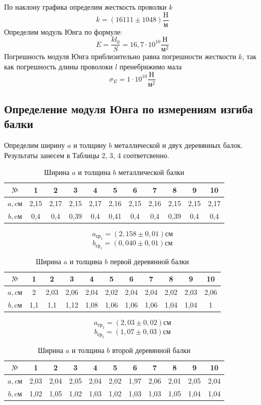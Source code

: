\documentclass[a4paper,12pt]{article} %
\begin{document}
По наклону графика определим жесткость проволки $k$
\[k = (16111\pm1048)\frac{\text{H}}{\text{м}}\]
Определим модуль Юнга по формуле:
\[E = \frac{kl_0}{S} = 16,7\cdot 10^{10}\frac{\text{Н}}{\text{м}^2}\]
Погрешность модуля Юнга приблизительно равна погрешности жесткости $k$, так как погрешность длины проволоки $l$ пренебрижимо мала
\[\sigma_E = 1\cdot 10^{10} \frac{\text{Н}}{\text{м}^2}\]
\subsection{Определение модуля Юнга по измерениям изгиба балки}
Определим ширину $a$ и толщину $b$ металлической и двух деревянных балок. Результаты занесем в Таблицы 2, 3, 4 соответсвенно.
\begin{table}[h]
\centering
\begin{tabular}{|c|c|c|c|c|c|c|c|c|c|c|}
\hline
$\text{№}$     & 1    & 2    & 3    & 4    & 5    & 6    & 7    & 8    & 9    & 10   \\ \hline
$a, \text{cм}$ & 2,15 & 2,17 & 2,15 & 2,17 & 2,16 & 2,15 & 2,16 & 2,15 & 2,15 & 2,17 \\ \hline
$b, \text{cм}$ & 0,4  & 0,4  & 0,39 & 0,4  & 0,41 & 0,4  & 0,4  & 0,39 & 0,4  & 0,4  \\ \hline
\end{tabular}
\caption{Ширина $a$ и толщина $b$ металлической балки}
\end{table}
\[a_{\text{ср}_1} =(2,158\pm0,01)\text{см} \]
\[b_{\text{ср}_1} =(0,040\pm0,01)\text{см} \]
\begin{table}[h]
\centering
\begin{tabular}{|c|c|c|c|c|c|c|c|c|c|c|}
\hline
$\text{№}$ & 1   & 2    & 3    & 4    & 5    & 6    & 7    & 8    & 9    & 10   \\ \hline
$a, \text{cм}$& 2   & 2,03 & 2,06 & 2,04 & 2,02 & 2,04 & 2,04 & 2,02 & 2,03 & 2,06 \\ \hline
$b, \text{cм}$ & 1,1 & 1,1  & 1,12 & 1,08 & 1,06 & 1,06 & 1,06 & 1,04 & 1,04 & 1    \\ \hline
\end{tabular}
\caption{Ширина $a$ и толщина $b$ первой деревянной балки}
\end{table}
\[a_{\text{ср}_2} =(2,03\pm0,02)\text{см} \]
\[b_{\text{ср}_2} =(1,07\pm0,03)\text{см} \]
\newpage
\begin{table}[h]
\centering
\begin{tabular}{|c|c|c|c|c|c|c|c|c|c|c|}
\hline
$\text{№}$ & 1    & 2    & 3    & 4    & 5    & 6    & 7    & 8    & 9    & 10   \\ \hline
$a, \text{cм}$ & 2,03 & 2,04 & 2,05 & 2,04 & 2,02 & 1,97 & 2,06 & 2,01 & 2,05 & 2,04 \\ \hline
$b, \text{cм}$ & 1,02 & 1,05 & 1,02 & 1,03 & 1,02 & 1,03 & 1,03 & 1,05 & 1,04 & 1,04 \\ \hline
\end{tabular}
\caption{Ширина $a$ и толщина $b$ второй деревянной балки}
\end{table}
\end{document}
